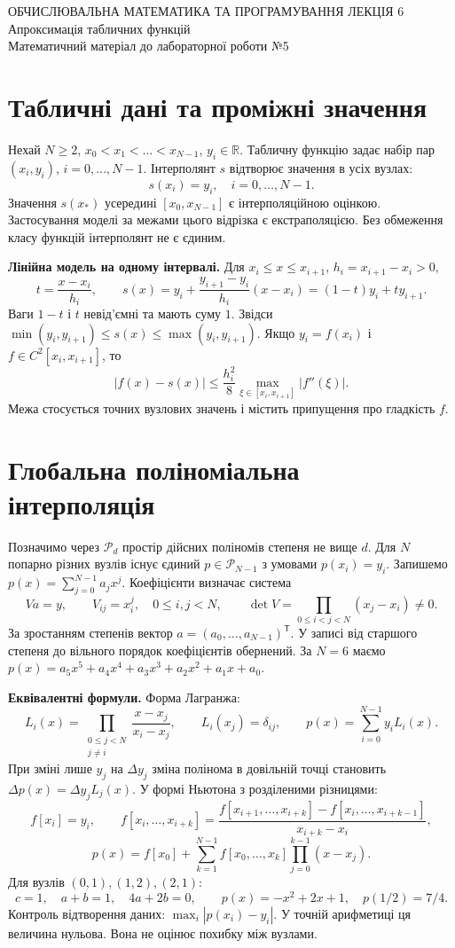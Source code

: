 \documentclass[11pt,a4paper]{article}
\newcommand{\R}{\mathbb R}
\newcommand{\PP}{\mathcal P}
\begin{document}
{\sffamily\small ОБЧИСЛЮВАЛЬНА МАТЕМАТИКА ТА ПРОГРАМУВАННЯ \hfill ЛЕКЦІЯ 6}\\[5mm]
{\sffamily\huge Апроксимація табличних функцій}\\[2mm]
{\sffamily Математичний матеріал до лабораторної роботи №5}
\section{Табличні дані та проміжні значення}
Нехай $N\ge 2$, $x_0<x_1<\dots<x_{N-1}$, $y_i\in\R$.
Табличну функцію задає набір пар $(x_i,y_i)$, $i=0,\ldots,N-1$.
Інтерполянт $s$ відтворює значення в усіх вузлах:
\[
    s(x_i)=y_i,\quad i=0,\ldots,N-1.
\]
Значення $s(x_*)$ усередині $[x_0,x_{N-1}]$ є інтерполяційною оцінкою.
Застосування моделі за межами цього відрізка є екстраполяцією.
Без обмеження класу функцій інтерполянт не є єдиним.

\textbf{Лінійна модель на одному інтервалі.}
Для $x_i\le x\le x_{i+1}$, $h_i=x_{i+1}-x_i>0$,
\[
t=\frac{x-x_i}{h_i},\qquad
s(x)=y_i+\frac{y_{i+1}-y_i}{h_i}(x-x_i)
=(1-t)y_i+ty_{i+1}.
\]
Ваги $1-t$ і $t$ невід’ємні та мають суму $1$. Звідси
$\min(y_i,y_{i+1})\le s(x)\le\max(y_i,y_{i+1})$.
Якщо $y_i=f(x_i)$ і $f\in C^2[x_i,x_{i+1}]$, то
\[
|f(x)-s(x)|\le \frac{h_i^2}{8}\max_{\xi\in[x_i,x_{i+1}]}|f''(\xi)|.
\]
Межа стосується точних вузлових значень і містить припущення про гладкість $f$.

\section{Глобальна поліноміальна інтерполяція}
Позначимо через $\PP_d$ простір дійсних поліномів степеня не вище $d$.
Для $N$ попарно різних вузлів існує єдиний $p\in\PP_{N-1}$ з умовами $p(x_i)=y_i$.
Запишемо $p(x)=\sum_{j=0}^{N-1}a_jx^j$. Коефіцієнти визначає система
\[
 V a=y,\qquad V_{ij}=x_i^j,\quad 0\le i,j<N,\qquad
 \det V=\prod_{0\le i<j<N}(x_j-x_i)\ne0 .
\]
За зростанням степенів вектор $a=(a_0,\dots,a_{N-1})^\mathsf{T}$.
У записі від старшого степеня до вільного порядок коефіцієнтів обернений.
За $N=6$ маємо $p(x)=a_5x^5+a_4x^4+a_3x^3+a_2x^2+a_1x+a_0$.

\textbf{Еквівалентні формули.}
Форма Лагранжа:
\[
 L_i(x)=\prod_{\substack{0\le j<N\\j\ne i}}\frac{x-x_j}{x_i-x_j},
 \qquad L_i(x_j)=\delta_{ij},\qquad p(x)=\sum_{i=0}^{N-1}y_iL_i(x).
\]
При зміні лише $y_j$ на $\Delta y_j$ зміна полінома в довільній точці становить
$\Delta p(x)=\Delta y_j L_j(x)$.
У формі Ньютона з розділеними різницями:
\[
 f[x_i]=y_i,\qquad
 f[x_i,\ldots,x_{i+k}]
 =\frac{f[x_{i+1},\ldots,x_{i+k}]-f[x_i,\ldots,x_{i+k-1}]}{x_{i+k}-x_i},
\]
\[
 p(x)=f[x_0]+\sum_{k=1}^{N-1} f[x_0,\ldots,x_k]\prod_{j=0}^{k-1}(x-x_j).
\]
Для вузлів $(0,1),(1,2),(2,1)$:
\[
c=1,\quad a+b=1,\quad 4a+2b=0,\qquad p(x)=-x^2+2x+1,\quad p(1/2)=7/4.
\]
Контроль відтворення даних: $\max_i|p(x_i)-y_i|$.
У точній арифметиці ця величина нульова.
Вона не оцінює похибку між вузлами.
\end{document}
